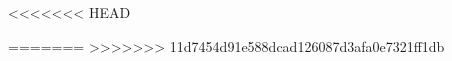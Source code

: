 \raggedbottom													%


\frontmatter													%


\tableofcontents*												%

\mainmatter														%





<<<<<<< HEAD





=======
>>>>>>> 11d7454d91e588dcad126087d3afa0e7321ff1db





\begingroup
\raggedright
							
\endgroup

\newpage														%

\appendix														%
\clearforchapter												%


